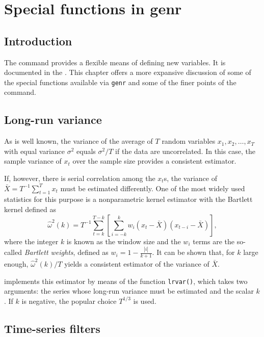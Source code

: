 \chapter{Special functions in genr}
\label{chap-genr}

\section{Introduction}
\label{genr-intro}

The  command provides a flexible means of defining new
variables.  It is documented in the \GCR.  This chapter offers a more
expansive discussion of some of the special functions available via
\verb+genr+ and some of the finer points of the command.
    
\section{Long-run variance}
\label{sec:lrvar}

As is well known, the variance of the average of $T$ random variables
$x_1, x_2, \ldots, x_T$ with equal variance $\sigma^2$ equals
$\sigma^2/T$ if the data are uncorrelated. In this case, the sample
variance of $x_t$ over the sample size provides a consistent estimator.

If, however, there is serial correlation among the $x_t$s, the
variance of $\bar{X} = T^{-1} \sum_{t=1}^T x_t$ must be estimated
differently. One of the most widely used statistics for this purpose
is a nonparametric kernel estimator with the Bartlett kernel defined
as
\begin{equation}
  \label{eq:scalar-lrvar}
  \hat{\omega}^2(k) = T^{-1} \sum_{t=k}^{T-k} \left[ \sum_{i=-k}^k w_i (x_t -
  \bar{X}) (x_{t-i} - \bar{X}) \right] ,
\end{equation}
where the integer $k$ is known as the window size and the $w_i$ terms
are the so-called \emph{Bartlett weights}, defined as $w_i = 1 -
\frac{|i|}{k + 1}$. It can be shown that, for $k$ large enough,
$\hat{\omega}^2(k)/T$ yields a consistent estimator of the variance of
$\bar{X}$.

 implements this estimator by means of the function
\texttt{lrvar()}, which takes two arguments: the series whose long-run
variance must be estimated and the scalar $k$. If $k$ is negative, the
popular choice $T^{1/3}$ is used.

\section{Time-series filters}
\label{sec:filters}

